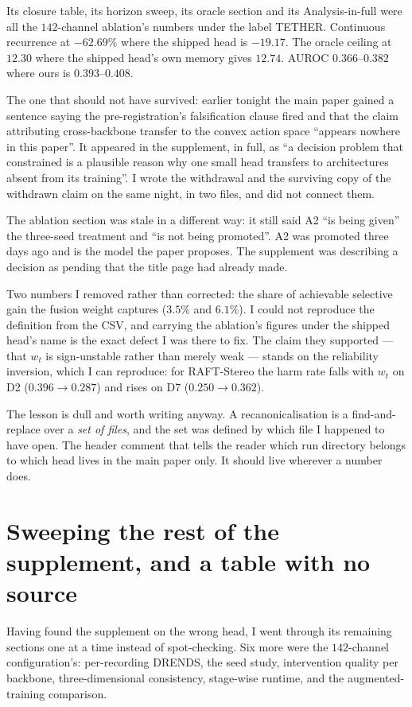 \documentclass[11pt,a4paper]{article}
\begin{document}
Its closure table, its horizon sweep, its oracle section and its
Analysis-in-full were all the $142$-channel ablation's numbers under the label
TETHER. Continuous recurrence at $-62.69\%$ where the shipped head is
$-19.17$. The oracle ceiling at $12.30$ where the shipped head's own memory
gives $12.74$. AUROC $0.366$--$0.382$ where ours is $0.393$--$0.408$.

The one that should not have survived: earlier tonight the main paper gained a
sentence saying the pre-registration's falsification clause fired and that the
claim attributing cross-backbone transfer to the convex action space
``appears nowhere in this paper''. It appeared in the supplement, in full, as
``a decision problem that constrained is a plausible reason why one small head
transfers to architectures absent from its training''. I wrote the withdrawal
and the surviving copy of the withdrawn claim on the same night, in two files,
and did not connect them.

The ablation section was stale in a different way: it still said A2 ``is being
given'' the three-seed treatment and ``is not being promoted''. A2 was
promoted three days ago and is the model the paper proposes. The supplement was
describing a decision as pending that the title page had already made.

Two numbers I removed rather than corrected: the share of achievable selective
gain the fusion weight captures ($3.5\%$ and $6.1\%$). I could not reproduce
the definition from the CSV, and carrying the ablation's figures under the
shipped head's name is the exact defect I was there to fix. The claim they
supported --- that $w_t$ is sign-unstable rather than merely weak --- stands on
the reliability inversion, which I can reproduce: for RAFT-Stereo the harm rate
falls with $w_t$ on D2 ($0.396\rightarrow0.287$) and rises on D7
($0.250\rightarrow0.362$).

The lesson is dull and worth writing anyway. A recanonicalisation is a
find-and-replace over a \emph{set of files}, and the set was defined by which
file I happened to have open. The header comment that tells the reader which
run directory belongs to which head lives in the main paper only. It should
live wherever a number does.


\section*{Sweeping the rest of the supplement, and a table with no source}

Having found the supplement on the wrong head, I went through its remaining
sections one at a time instead of spot-checking. Six more were the
$142$-channel configuration's: per-recording DRENDS, the seed study,
intervention quality per backbone, three-dimensional consistency, stage-wise
runtime, and the augmented-training comparison.
\end{document}
